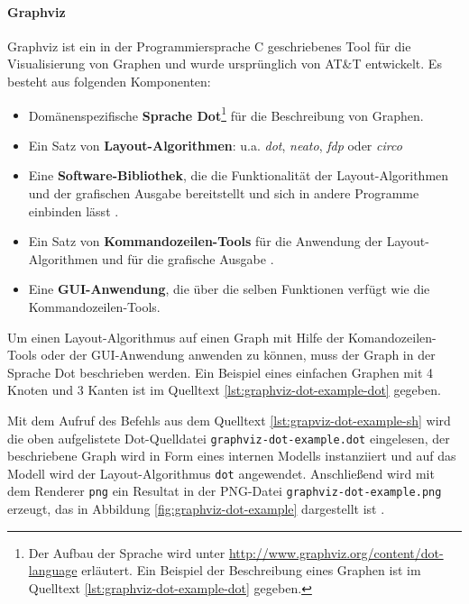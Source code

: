 \paragraph{Graphviz}

Graphviz ist ein in der Programmiersprache C geschriebenes Tool für die Visualisierung von Graphen und wurde ursprünglich von AT\&T entwickelt. Es besteht aus folgenden Komponenten:

\begin{itemize}
    \item Domänenspezifische \textbf{Sprache Dot}\footnote{Der Aufbau der Sprache wird unter \url{http://www.graphviz.org/content/dot-language} erläutert. Ein Beispiel der Beschreibung eines Graphen ist im Quelltext \ref{lst:graphviz-dot-example-dot} gegeben.} für die Beschreibung von Graphen.
    \item Ein Satz von \textbf{Layout-Algorithmen}: u.a. \textit{dot}, \textit{neato}, \textit{fdp} oder \textit{circo} \cite{Gansner14Using, NorthGansner14Dot-Manual}
    \item Eine \textbf{Software-Bibliothek}, die die Funktionalität der Layout-Algorithmen und der grafischen Ausgabe bereitstellt und sich in andere Programme einbinden lässt \cite{Gansner14Using}.
    \item Ein Satz von \textbf{Kommandozeilen-Tools} für die Anwendung der Layout-Algorithmen und für die grafische Ausgabe \cite{NorthGansner14Dot-Manual}.
    \item Eine \textbf{GUI-Anwendung}, die über die selben Funktionen verfügt wie die Kommandozeilen-Tools.
\end{itemize}


Um einen Layout-Algorithmus auf einen Graph mit Hilfe der Komandozeilen-Tools oder der GUI-Anwendung anwenden zu können, muss der Graph in der Sprache Dot beschrieben werden. Ein Beispiel eines einfachen Graphen mit 4 Knoten und 3 Kanten ist im Quelltext \ref{lst:graphviz-dot-example-dot} gegeben.



Mit dem Aufruf des Befehls aus dem Quelltext \ref{lst:grapviz-dot-example-sh} wird die oben aufgelistete Dot-Quelldatei \lstinline{graphviz-dot-example.dot} eingelesen, der beschriebene Graph wird in Form eines internen Modells instanziiert und auf das Modell wird der Layout-Algorithmus \lstinline{dot} angewendet. Anschließend wird mit dem Renderer \lstinline{png} ein Resultat in der PNG-Datei \lstinline{graphviz-dot-example.png} erzeugt, das in Abbildung \ref{fig:graphviz-dot-example} dargestellt ist \cite{Gansner14Using}.

